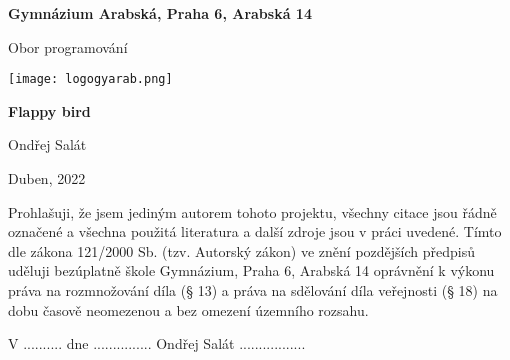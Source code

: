 \begin{titlepage}
\begin{center}
\large \vspace*{\fill}
\thispagestyle{empty}

\LARGE

{ \huge \textbf{Gymnázium Arabská, Praha 6, Arabská 14}}

{\LARGE Obor programování }

\vfill
\texttt{[image: logogyarab.png]}
\vspace{15pt}

\vfill

{\huge \textbf{Flappy bird}}

\vfill

Ondřej Salát

\vfill

{\large Duben, 2022}

\vspace*{\fill}
\end{center}
\end{titlepage}

\thispagestyle{empty}
\addtocounter{page}{-1}
\vspace*{\fill}
Prohlašuji, že jsem jediným autorem tohoto projektu, všechny citace jsou řádně označené a všechna
použitá literatura a další zdroje jsou v práci uvedené. Tímto dle zákona 121/2000 Sb. (tzv. Autorský zákon) 
ve znění pozdějších předpisů uděluji bezúplatně škole Gymnázium, Praha 6, Arabská 14 oprávnění k výkonu 
práva na rozmnožování díla (§ 13) a práva na sdělování díla veřejnosti (§ 18) na dobu časově neomezenou a 
bez omezení územního rozsahu.
\bigskip

V .......... dne ............... \hspace{4cm} Ondřej Salát .................
\vspace{2cm}

\newpage


\tableofcontents